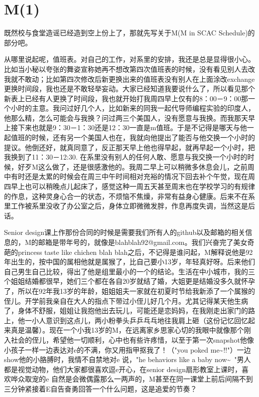 \documentclass[12pt]{book}
\begin{document}
\section{M(1)}
\label{sec-15-1}

既然校与食堂造谣已经造到空上份上了，那就先写关于M(M in SCAC Schedule)的部分吧。　

从哪里说起呢，值班表。对自己的工作，对系里的安排，我还是总是显得很小心。比如当小秘以夸张的舞姿宣称她再不想改第四次值班表的时候，没有看见别人去改我就不敢动；比如第四次修改后新更换出来的值班表没有别人在上面涂改exchange更换时间段，我也还是不敢轻举妄动。大家已经知道我要说什么了，所以看见那个新表上已经有人更换了时间段，我也就开始打我周四早上仅有的8：00－9：00那一个小时的主意。我问过好几个人，比如新来的同我一起代导师编程实验的印度人，他那么精，怎么可能会与我换？问过两三个美国人，没有愿意与我换。而我那天早上接下来也就是9：30－1：30还是12：30一直是m值班。于是不记得是哪天与他一起值班的时候，还有另一个美国人也在，我就向他提出了能否与他交换一个小时的提议。他倒还好，就真同意了，反正那天早上他也得早起，就再早起一个小时，把我换到了11：30－12:30. 在系里没有别人的任何人敢、愿意与我交换一个小时的时候，好歹M这么做了，还是很感激他的。我周二早上可以稍微多休息会儿，之前周中有时还是太累的时候会在周三中午时间相对充裕的情况下回去补个午觉，现在周四早上也可以稍晚点儿起床了，感觉这种一周五天甚至周末也在学校学习的有规律的作息，这种灵身心合一的状态，不烦恼不焦燥，非常有益身心健康。后来不在系里工作被系里没收了办公室之后，身体立即微微发胖，作息再度失调，当然这是后话。

Senior design课上作那份合同的时候是需要我们所有人的github以及邮箱的相关信息的，M的邮箱是带年号的，就像是blahblah92@gmail.com。我们兴奋完了美女奇葩的princess taste like chichen blah blah之后，不记得是谁问起，M解释说他是92年出生的，按中国的属相他就是属猴了，比自己要小13岁，年轻真好呀。后来他们自己男生自己比较，得出了他是组里最小的一个的结论。生活在中小城市，我的三个姐姐结婚都很早，她们三个都在各自20岁就结了婚，大姐更是结婚没多久就怀孕了，所以在92年我13岁的年龄，姐姐姐夫一家就在初夏时节给我新添了一个属猴的侄儿。开学前我亲自在大人的指点下带过小侄儿好几个月。尤其记得某天他生病了，身体不舒服，姐姐让我抱他出去玩儿，可能还是恋妈妈，在我刚走出家门的路上，他一小人意识到这点儿，两小粉拳头乒乒乓乓地往我肩上砸（这份记忆回忆起来真是温馨）。现在一个小我13岁的M，在远离家乡思家心切的我眼中就像那个刚入社会的侄儿，希望他一切顺利，心中也有些许疼惜，以至于第一次snapshot他像小孩子一样一边表达对e的不满，你又用指甲抠我了！（"you poked me\textasciitilde{}!!"）一边show他的小胳膊时，我情不自禁地对e 说，"he behaviors like a baby now\textasciitilde{}~"男人都是视觉动物，他们大家都很喜欢逗e开心，在senior design扇形教室上课时，喜欢哗众取宠的e 自然是会微偶露那么一两声的，M甚至在同一课堂上前后间隔不到三分钟紧接着E自告奋勇回答一个什么问题，这是追爱的节奏？
\end{document}
